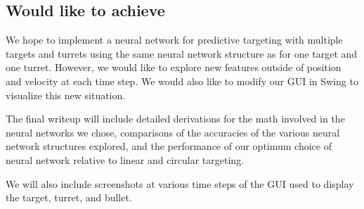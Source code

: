 \documentclass[11pt,letterpaper]{article}
\begin{document}
\subsection{Would like to achieve}

We hope to implement a neural network for predictive targeting with multiple targets and turrets using the same neural network structure as for one target and one turret. However, we would like to explore new features outside of position and velocity at each time step. We would also like to modify our GUI in Swing to visualize this new situation.

The final writeup will include detailed derivations for the math involved in the neural networks we chose, comparisons of the accuracies of the various neural network structures explored, and the performance of our optimum choice of neural network relative to linear and circular targeting.

We will also include screenshots at various time steps of the GUI used to display the target, turret, and bullet.



\end{document}
